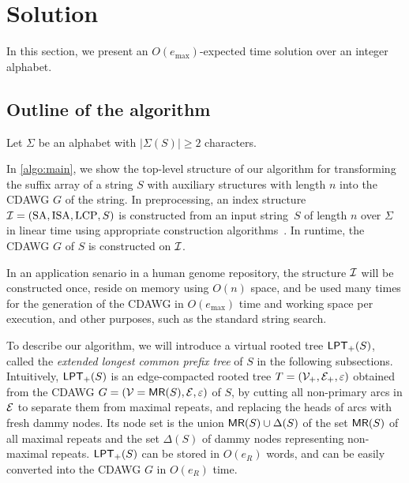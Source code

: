 \documentclass{article}
\begin{document}
\section{Solution}
\label{sec:solution}

In this section, we present an $O(e_{\max})$-expected time solution over an integer alphabet.

\subsection{Outline of the algorithm}
Let $\Sigma$ be an alphabet with $|\Sigma(S)| \ge 2$ characters. 

In \cref{algo:main}, we show the top-level structure of our algorithm for transforming the suffix array of a string $S$ with auxiliary structures with length $n$ into the CDAWG $G$ of the string. In preprocessing, an index structure $\sig I = (\SA, \ISA, \LCP, S)$ is constructed from an input string~$S$ of length $n$ over $\Sigma$ in linear time using appropriate construction algorithms~\cite{navarro2016cds:book,navarro2021indexing:ii}.
In runtime, the CDAWG $G$ of $S$ is constructed on $\sig I$. 

{
\setlength{\algotitleheightrule}{0pt}%
\begin{algorithm}[h]
  \caption{Transforming $SA$ and $S$ into its CDAWG $G$.
  }\label{algo:main}
\end{algorithm}
}

In an application senario in a human genome repository, the structure $\sig I$ will be constructed once, reside on memory using $O(n)$ space, and be used many times for the generation of the CDAWG in $O(e_{\max})$ time and working space per execution, and other purposes, such as the standard string search.

To describe our algorithm, we will introduce a virtual rooted tree $\LPT[+](S)$, called the \textit{extended longest common prefix tree} of $S$ in the following subsections.
Intuitively, $\LPT[+](S)$ is an edge-compacted rooted tree $T = (\sig V_+, \sig E_+, \eps)$ obtained from the CDAWG $G = (\sig V = \MR(S), \sig E, \eps)$ of $S$, by cutting all non-primary arcs in $\sig E$ to separate them from maximal repeats, and replacing the heads of arcs with fresh dammy nodes. Its node set is the union $\MR(S)\cup \Delta(S)$ of the set $\MR(S)$ of all maximal repeats and the set $\Delta(S)$ of dammy nodes representing non-maximal repeats. $\LPT[+](S)$ can be stored in $O(e_R)$ words, and can be easily converted into the CDAWG $G$ in $O(e_R)$ time. 
\end{document}

